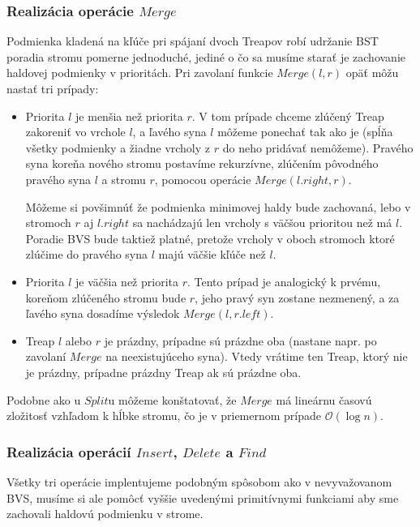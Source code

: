 \documentclass[a4paper, 12pt]{article}
\theoremstyle{definition}
\begin{document}
\subsubsection{Realizácia operácie $Merge$}

Podmienka kladená na kľúče pri spájaní dvoch Treapov robí udržanie BST poradia
stromu pomerne jednoduché, jediné o čo sa musíme starať je zachovanie haldovej
podmienky v prioritách. Pri zavolaní funkcie $Merge(l, r)$ opäť môžu nastať tri
prípady:

\begin{itemize}
    \item Priorita $l$ je menšia než priorita $r$. V tom prípade
        chceme zlúčený Treap zakoreniť vo vrchole $l$, a ľavého syna $l$
        môžeme ponechať tak ako je (spĺňa všetky podmienky a žiadne vrcholy z
        $r$ do neho pridávať nemôžeme). Pravého syna koreňa nového stromu
        postavíme rekurzívne, zlúčením pôvodného pravého syna $l$ a
        stromu $r$, pomocou operácie $Merge(l.right, r)$. 

        Môžeme si povšimnúť že podmienka minimovej haldy bude zachovaná, lebo v
        stromoch $r$ aj $l.right$ sa nachádzajú len vrcholy s väčšou prioritou
        než má $l$. Poradie BVS bude taktiež platné, pretože vrcholy v oboch
        stromoch ktoré zlúčime do pravého syna $l$ majú väčšie kľúče než $l$.

    \item Priorita $l$ je väčšia než priorita $r$. Tento prípad je analogický
        k prvému, koreňom zlúčeného stromu bude $r$, jeho pravý syn zostane
        nezmenený, a za ľavého syna dosadíme výsledok $Merge(l, r.left)$.

    \item Treap $l$ alebo $r$ je prázdny, prípadne sú prázdne oba
        (nastane
        napr. po zavolaní $Merge$ na neexistujúceho syna). Vtedy vrátime ten
        Treap, ktorý nie je prázdny, prípadne prázdny Treap ak sú prázdne oba.
\end{itemize}

Podobne ako u $Split$u môžeme konštatovať, že $Merge$ má lineárnu časovú
zložitosť vzhľadom k hĺbke stromu, čo je v priemernom prípade $\mathcal{O}(\log
n)$.

\subsubsection{Realizácia operácií $Insert$, $Delete$ a $Find$}

Všetky tri operácie implentujeme podobným spôsobom ako v nevyvažovanom BVS,
musíme si ale pomôcť vyššie uvedenými primitívnymi funkciami aby sme zachovali
haldovú podmienku v strome.
\end{document}
